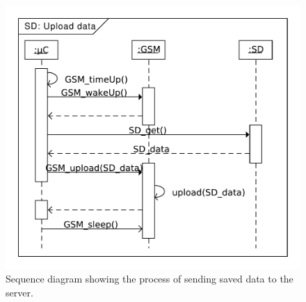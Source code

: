 \begin{figure}
	\centering
	\includegraphics[width=0.7\linewidth]{gfx/Design/SD_Upload.pdf}
	\caption{Sequence diagram showing the process of sending saved data to the server.}
	\label{fig:SD:upload}
\end{figure}

\FloatBarrier
